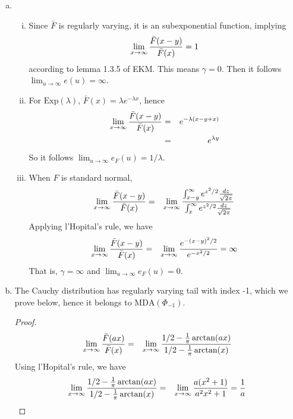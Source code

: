 \documentclass{report}
\begin{document}
\begin{enumerate}[1.]
\begin{enumerate}[(a)]
  \item
    \begin{enumerate}[(i)]
    \item Since $\bar{F}$ is regularly varying, it is an
      subexponential function, implying
      \[
      \lim_{x \to \infty} {\bar{F}(x - y) \over \bar{F}(x)} = 1
      \]
      according to lemma 1.3.5 of EKM. This means $\gamma =
      0$. Then it follows $\lim_{u \to \infty} e(u) = \infty$.

    \item For $\text{Exp}(\lambda)$, $\bar{F}(x) = \lambda e^{-\lambda
        x}$, hence
      \begin{eqnarray*}
        \lim_{x \to \infty} {\bar{F}(x - y) \over \bar{F}(x)} &=&
        e^{-\lambda (x - y + x)} \\
        &=& e^{\lambda y}
      \end{eqnarray*}
      So it follows $\lim_{u \to \infty} e_F(u) = 1/\lambda$.

    \item When $F$ is standard normal,
      \begin{eqnarray*}
        \lim_{x \to \infty} {\bar{F}(x - y) \over \bar{F}(x)} &=&
        \lim_{x \to \infty} \frac{
          \int_{x-y}^{\infty} e^{z^2/2} {dz \over \sqrt{2\pi}}
        }{
          \int_{x}^{\infty} e^{z^2/2} {dz \over \sqrt{2\pi}}
        }
      \end{eqnarray*}
      Applying l'Hopital's rule, we have
      \begin{eqnarray*}
        \lim_{x \to \infty} {\bar{F}(x - y) \over \bar{F}(x)} &=&
        \lim_{x \to \infty} {e^{-(x-y)^2/2} \over e^{-x^2/2}} = \infty\\
      \end{eqnarray*}
      That is, $\gamma = \infty$ and $\lim_{u \to \infty} e_F(u) =
      0$.
    \end{enumerate}

  \item The Cauchy distribution has regularly varying tail with index
    -1, which we prove below, hence it belongs to
    $\text{MDA}(\Phi_{-1})$.
    \begin{proof}
      \begin{eqnarray*}
        \lim_{x \to \infty} {\bar{F}(ax) \over \bar{F}(x)} &=&
        \lim_{x \to \infty}
        {
          1/2 - {1 \over \pi} \arctan(ax)
          \over
          1/2 - {1 \over \pi} \arctan(x)
        }
      \end{eqnarray*}
      Using l'Hopital's rule, we have
      \begin{eqnarray*}
        \lim_{x \to \infty}
        {
          1/2 - {1 \over \pi} \arctan(ax)
          \over
          1/2 - {1 \over \pi} \arctan(x)
        } &=&
        \lim_{x \to \infty} {
          a(x^2 + 1)
          \over
          a^2 x^2 + 1
        } = {1 \over a}\\
      \end{eqnarray*}
    \end{proof}
  \end{enumerate}
\end{enumerate}
\end{document}
